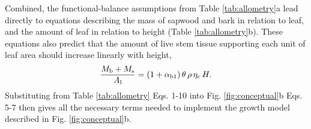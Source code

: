 \documentclass[9pt,twocolumn,twoside,lineno]{pnas-new}
\begin{document}
Combined, the functional-balance assumptions from Table \ref{tab:allometry}a lead directly to equations describing the mass of sapwood and bark in relation to leaf, and the amount of leaf in relation to height (Table \ref{tab:allometry}b). These equations also predict that the amount of live stem tissue supporting each unit of leaf area should increase linearly with height,
\begin{equation}\label{eq:msml}
\frac{M_{\rm b} + M_{\rm s}}{A_{\rm l}} = (1+ \alpha_{\rm b1}) \,\theta \, \rho \, \eta_c \, H.
\end{equation}
Substituting from Table \ref{tab:allometry} Eqs. {\color{pnasbluetext}1}-{\color{pnasbluetext}10} into Fig. \ref{fig:conceptual}b Eqs. {\color{pnasbluetext}5}-{\color{pnasbluetext}7} then gives all the necessary terms needed to implement the growth model described in Fig. \ref{fig:conceptual}b. 
\end{document}
